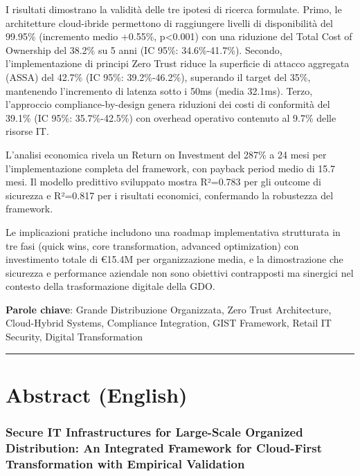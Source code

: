 \documentclass[12pt,a4paper,oneside]{book}
\begin{document}
I risultati dimostrano la validità delle tre ipotesi di ricerca
formulate. Primo, le architetture cloud-ibride permettono di raggiungere
livelli di disponibilità del 99.95\% (incremento medio +0.55\%,
p\textless0.001) con una riduzione del Total Cost of Ownership del
38.2\% su 5 anni (IC 95\%: 34.6\%-41.7\%). Secondo, l'implementazione di
principi Zero Trust riduce la superficie di attacco aggregata (ASSA) del
42.7\% (IC 95\%: 39.2\%-46.2\%), superando il target del 35\%,
mantenendo l'incremento di latenza sotto i 50ms (media 32.1ms). Terzo,
l'approccio compliance-by-design genera riduzioni dei costi di
conformità del 39.1\% (IC 95\%: 35.7\%-42.5\%) con overhead operativo
contenuto al 9.7\% delle risorse IT.

L'analisi economica rivela un Return on Investment del 287\% a 24 mesi
per l'implementazione completa del framework, con payback period medio
di 15.7 mesi. Il modello predittivo sviluppato mostra R²=0.783 per gli
outcome di sicurezza e R²=0.817 per i risultati economici, confermando
la robustezza del framework.

Le implicazioni pratiche includono una roadmap implementativa
strutturata in tre fasi (quick wins, core transformation, advanced
optimization) con investimento totale di €15.4M per organizzazione
media, e la dimostrazione che sicurezza e performance aziendale non sono
obiettivi contrapposti ma sinergici nel contesto della trasformazione
digitale della GDO.

\textbf{Parole chiave}: Grande Distribuzione Organizzata, Zero Trust
Architecture, Cloud-Hybrid Systems, Compliance Integration, GIST
Framework, Retail IT Security, Digital Transformation

\begin{center}\rule{0.5\linewidth}{0.5pt}\end{center}

\section{Abstract (English)}\label{abstract-english}

\subsubsection{Secure IT Infrastructures for Large-Scale Organized
Distribution: An Integrated Framework for Cloud-First Transformation
with Empirical
Validation}\label{secure-it-infrastructures-for-large-scale-organized-distribution-an-integrated-framework-for-cloud-first-transformation-with-empirical-validation}
\end{document}
